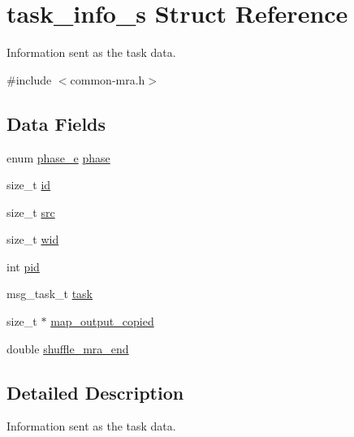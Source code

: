 \hypertarget{structtask__info__s}{\section{task\-\_\-info\-\_\-s \-Struct \-Reference}
\label{structtask__info__s}
}


\-Information sent as the task data.  




{\ttfamily \#include $<$common-\/mra.\-h$>$}

\subsection*{\-Data \-Fields}
\begin{DoxyCompactItemize}
\item 
enum \hyperlink{mra_8h_afa14b6e068c0e0b8557777e16f2582f2}{phase\-\_\-e} \hyperlink{structtask__info__s_afa72d514e04545e1916981f970178902}{phase}
\item 
size\-\_\-t \hyperlink{structtask__info__s_a4974ced5dfb8d5d2ab72351cc12e1bb6}{id}
\item 
size\-\_\-t \hyperlink{structtask__info__s_a80e71f08fc31bfe88a8c546f0e8155d7}{src}
\item 
size\-\_\-t \hyperlink{structtask__info__s_a7b70c65e767769e2a42e6c5978c2c669}{wid}
\item 
int \hyperlink{structtask__info__s_abf5e8401c80afb200b761ed7207cfcea}{pid}
\item 
msg\-\_\-task\-\_\-t \hyperlink{structtask__info__s_a852100955a5ed323f31c670ef596787c}{task}
\item 
size\-\_\-t $\ast$ \hyperlink{structtask__info__s_a89d391613219da550d84283a89461bf4}{map\-\_\-output\-\_\-copied}
\item 
double \hyperlink{structtask__info__s_a3f07b243958c81aab30d87f2f8aa63c3}{shuffle\-\_\-mra\-\_\-end}
\end{DoxyCompactItemize}


\subsection{\-Detailed \-Description}
\-Information sent as the task data. 

